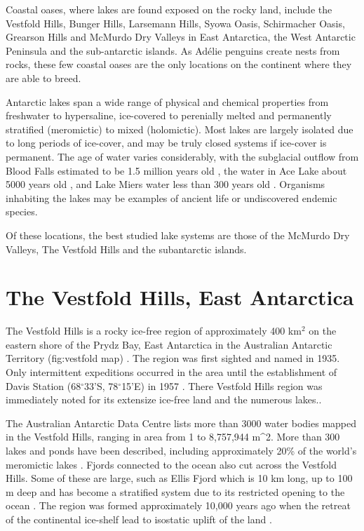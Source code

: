 \documentclass{book}
\begin{document}
Coastal oases, where lakes are found exposed on the rocky land, include the Vestfold Hills, Bunger Hills, Larsemann Hills, Syowa Oasis, Schirmacher Oasis, Grearson Hills and McMurdo Dry Valleys
 in East Antarctica, the West Antarctic Peninsula and the sub-antarctic islands.
As Ad\'{e}lie penguins create nests from rocks, these few coastal oases are the only locations on the continent where they are able to breed.

Antarctic lakes span a wide range of physical and chemical properties from freshwater to hypersaline, ice-covered to perenially melted and permanently stratified (meromictic) to mixed (holomictic).
Most lakes are largely isolated due to long periods of ice-cover, and may be truly closed systems if ice-cover is permanent.
The age of water varies considerably, with the subglacial outflow from Blood Falls estimated to be 1.5 million years old \cite{Mickucki2009}, the water in Ace Lake about 5000 years old
 \cite{Rankin1999}, and Lake Miers water less than 300 years old \cite{Green1988}. %
Organisms inhabiting the lakes may be examples of ancient life or undiscovered endemic species.

Of these locations, the best studied lake systems are those of the McMurdo Dry Valleys, The Vestfold Hills and the subantarctic islands.


\section{The Vestfold Hills, East Antarctica}

The Vestfold Hills is a rocky ice-free region of approximately 400 km$^2$ on the eastern shore of the Prydz Bay, East Antarctica in the Australian Antarctic Territory (fig:vestfold map) \cite{Gibson1999}.
The region was first sighted and named in 1935\cite{Law1959}.
Only intermittent expeditions occurred in the area until the establishment of Davis Station (68$^{\circ}$33'S, 78$^{\circ}$15'E) in 1957 \cite {Law1959}. 
There Vestfold Hills region was immediately noted for its extensize ice-free land and the numerous lakes.\cite{Johnstone1973}.

The Australian Antarctic Data Centre lists more than 3000 water bodies mapped in the Vestfold Hills, ranging in area from 1 to 8,757,944 m\^{}2.%
More than 300 lakes and ponds have been described, including approximately 20\% of the world's meromictic lakes \cite{Gibson, 1999}. %
Fjords connected to the ocean also cut across the Vestfold Hills. 
Some of these are large, such as Ellis Fjord which is 10 km long, up to 100 m deep and has become a stratified system due to its restricted opening to the ocean \cite{Burke1988}.
The region was formed approximately 10,000 years ago when the retreat of the continental ice-shelf lead to isostatic uplift of the land \cite{Burton1981}. 
\end{document}
